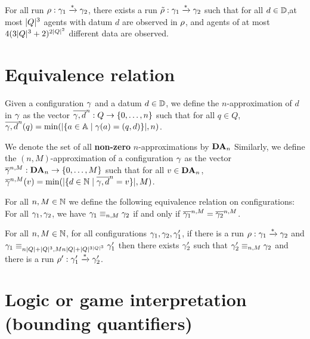 \documentclass[a4paper,UKenglish,cleveref, autoref, thm-restate]{lipics-v2021}
\begin{document}
	 \begin{corollary}
		For all run $\run : \config_1 \xrightarrow{*} \config_2$, there exists a run $\Tilde{\run} : \config_1 \xrightarrow{*} \config_2$ such that for all $d \in \Dataset$,at most $\size{Q}^3$ agents with datum $d$ are observed in $\run$, and agents of at most $4(3\size{Q}^3+2)^{2\size{Q}^2}$ different data are observed.
	\end{corollary}
	
	
	\section{Equivalence relation}
	
	Given a configuration $\config$ and a datum $d \in \Dataset$, we define the $n$-approximation of $d$ in $\config$ as the vector $\dataapprox{n}{\config}{d} : Q \to \nset{0}{n}$ such that for all $q\in Q$, $\dataapprox{n}{\config}{d}(q)=\min(\size{\set{a \in \Agentset \mid \config(a)= (q,d)}},n)$.
	
	We denote the set of all \textbf{non-zero} $n$-approximations by $\DataApproxSet{n}$
	Similarly, we define the $(n,M)$-approximation of a configuration $\config$ as the vector $\configapprox{n}{M}{\config} : \DataApproxSet{n} \to \nset{0}{M}$ such that for all $v\in \DataApproxSet{n}$,
	$\configapprox{n}{M}{\config}(v) = \min(\size{\set{d \in \nats \mid \dataapprox{n}{\config}{d} = v}},M)$.
	
	
	For all $n, M \in \nats$ we define the following equivalence relation on configurations: 
	For all $\config_1, \config_2$, we have $\config_1 \equiv_{n,M} \config_2$ if and only if $\configapprox{n}{M}{\config_1} = \configapprox{n}{M}{\config_2}$.
	
	

	\begin{lemma}
		For all $n, M \in \nats$, for all configurations $\config_1, \config_2, \config_1'$, if there is a run $\run : \config_1 \xrightarrow{*} \config_2$ and $\config_1 \equiv_{n\size{Q}+\size{Q}^3,Mn\size{Q}+\size{Q}^{3\size{Q}^3}} \config'_1$ then there exists $\config'_2$ such that $\config'_2 \equiv_{n,M} \config_2$ and there is a run $\run' : \config_1' \xrightarrow{*} \config_2'$.
	\end{lemma}
	
	\section{Logic or game interpretation (bounding quantifiers)}
	
\end{document}
